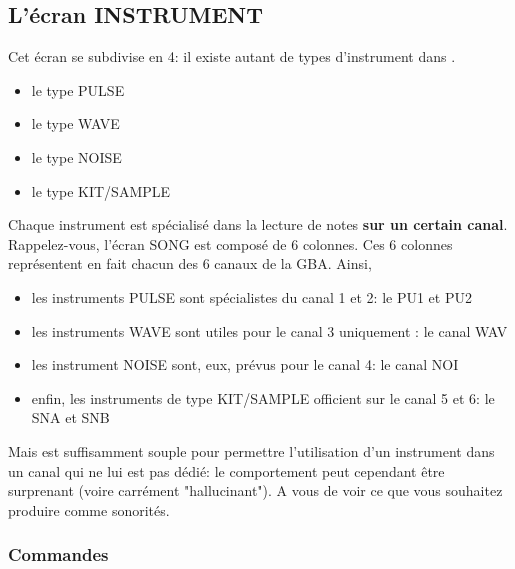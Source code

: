 \documentclass[12pt,a4paper]{article}
\begin{document}
    \subsection{L'écran INSTRUMENT}
    
    Cet écran se subdivise en 4: il existe autant de types d'instrument dans \FAT.
    \medskip
    
    \begin{itemize}
        \item{le type PULSE}
        \item{le type WAVE}
        \item{le type NOISE}
        \item{le type KIT/SAMPLE}
    \end{itemize}\medskip
    
     Chaque instrument est spécialisé dans la lecture de notes {\bf sur un certain canal}.
     Rappelez-vous, l'écran SONG est composé de 6 colonnes.
     Ces 6 colonnes représentent en fait chacun des 6 canaux de la GBA. Ainsi,
     \medskip
     
     \begin{itemize}
        \item{les instruments PULSE sont spécialistes du canal 1 et 2: le PU1 et PU2}
        \item{les instruments WAVE sont utiles pour le canal 3 uniquement : le canal WAV}
        \item{les instrument NOISE sont, eux, prévus pour le canal 4: le canal NOI}
        \item{enfin, les instruments de type KIT/SAMPLE officient sur le canal 5 et 6: le SNA et SNB}
     \end{itemize}\medskip
     
     Mais \FAT est suffisamment souple pour permettre l'utilisation d'un instrument dans un canal qui ne lui est pas dédié:
     le comportement peut cependant être surprenant (voire carrément "hallucinant").
     A vous de voir ce que vous souhaitez produire comme sonorités.

    \subsubsection{Commandes}
\end{document}
